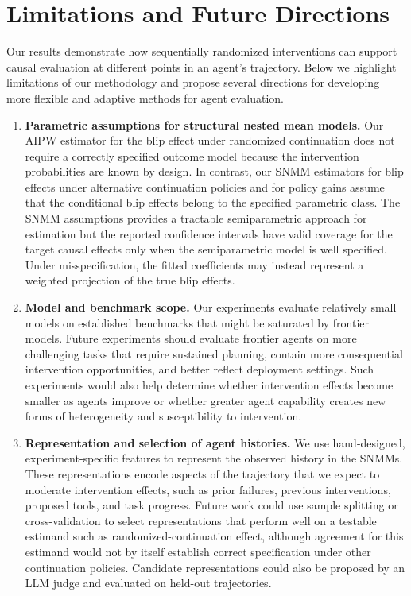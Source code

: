 \section{Limitations and Future Directions}
\label{sec:discussion}

Our results demonstrate how sequentially randomized interventions can support causal evaluation at different points in an agent’s trajectory. Below we highlight limitations of our methodology and propose several directions for developing more flexible and adaptive methods for agent evaluation.

\begin{enumerate}
    \item \textbf{Parametric assumptions for structural nested mean models.}
    Our AIPW estimator for the blip effect under randomized continuation does not require a correctly specified outcome model because the intervention probabilities are known by design. In contrast, our SNMM estimators for blip effects under alternative continuation policies and for policy gains assume that the conditional blip effects belong to the specified parametric class. The SNMM assumptions provides a tractable semiparametric approach  for estimation but the reported confidence intervals have valid coverage for the target causal effects only when the semiparametric model is well specified. Under misspecification, the fitted coefficients may instead represent a weighted projection of the true blip effects. 

    \item \textbf{Model and benchmark scope.}
    Our experiments evaluate relatively small models on established benchmarks that might be saturated by frontier models. Future experiments should evaluate frontier agents on more challenging tasks that require sustained planning, contain more consequential intervention opportunities, and better reflect deployment settings. Such experiments would also help determine whether intervention effects become smaller as agents improve or whether greater agent capability creates new forms of heterogeneity and susceptibility to intervention.

    \item \textbf{Representation and selection of agent histories.}
    We use hand-designed, experiment-specific features to represent the observed history in the SNMMs. These representations encode aspects of the trajectory that we expect to moderate intervention effects, such as prior failures, previous interventions, proposed tools, and task progress. Future work could use sample splitting or cross-validation to select representations that perform well on  a  testable estimand such as randomized-continuation effect, although agreement for this estimand would not by itself establish correct specification under other continuation policies. Candidate representations could also be proposed by an LLM judge and evaluated on held-out trajectories.


\end{enumerate}

